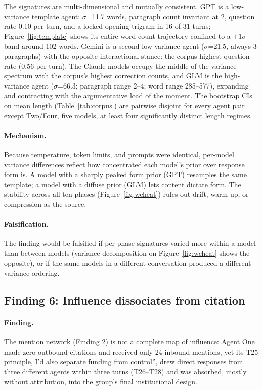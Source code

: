 \documentclass[sigconf,nonacm=true]{acmart}
\begin{document}
The signatures are multi-dimensional and mutually consistent. GPT is a low-variance template agent: $\sigma$=11.7 words, paragraph count invariant at 2, question rate 0.10 per turn, and a locked opening trigram in 16 of 31 turns; Figure~\ref{fig:template} shows its entire word-count trajectory confined to a $\pm 1\sigma$ band around 102 words. Gemini is a second low-variance agent ($\sigma$=21.5, always 3 paragraphs) with the opposite interactional stance: the corpus-highest question rate (0.56 per turn). The Claude models occupy the middle of the variance spectrum with the corpus's highest correction counts, and GLM is the high-variance agent ($\sigma$=66.3; paragraph range 2--4; word range 285--577), expanding and contracting with the argumentative load of the moment. The bootstrap CIs on mean length (Table~\ref{tab:corpus}) are pairwise disjoint for every agent pair except Two/Four, five models, at least four significantly distinct length regimes.

\paragraph{Mechanism.} Because temperature, token limits, and prompts were identical, per-model variance differences reflect how concentrated each model's prior over response form is. A model with a sharply peaked form prior (GPT) resamples the same template; a model with a diffuse prior (GLM) lets content dictate form. The stability across all ten phases (Figure~\ref{fig:wcheat}) rules out drift, warm-up, or compression as the source.

\paragraph{Falsification.} The finding would be falsified if per-phase signatures varied more within a model than between models (variance decomposition on Figure~\ref{fig:wcheat} shows the opposite), or if the same models in a different conversation produced a different variance ordering.

\subsection{Finding 6: Influence dissociates from citation}
\label{sec:f6}

\paragraph{Finding.} The mention network (Finding 2) is not a complete map of influence: Agent One made zero outbound citations and received only 24 inbound mentions, yet its T25 principle, I'd also separate funding from control'', drew direct responses from three different agents within three turns (T26--T28) and was absorbed, mostly without attribution, into the group's final institutional design.
\end{document}
